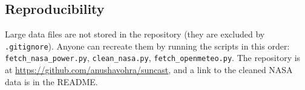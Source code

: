 \subsection{Reproducibility}
Large data files are not stored in the repository (they are excluded by \texttt{.gitignore}). Anyone can recreate them by running the scripts in this order: \texttt{fetch\_nasa\_power.py}, \texttt{clean\_nasa.py}, \texttt{fetch\_openmeteo.py}. The repository is at \url{https://github.com/anushavohra/suncast}, and a link to the cleaned NASA data is in the README.